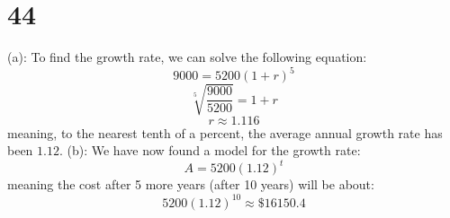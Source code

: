 \documentclass{article}
\theoremstyle{definition}
\newcommand{\?}{\stackrel{?}{=}}
\begin{document}
\section*{44}
(a): To find the growth rate, we can solve the following equation:
\[ 9000=5200(1+r)^5 \] \[ \sqrt[5]{\frac{9000}{5200}}=1+r \] \[ r\approx 1.116 \] meaning, to the nearest tenth of a percent, the average 
annual growth rate has been $1.12$.
(b): We have now found a model for the growth rate: \[ A=5200(1.12)^t \] meaning the cost after 5 more years (after 10 years) will be about:
\[ 5200(1.12)^{10}\approx \$ 16150.4 \]
\end{document}
